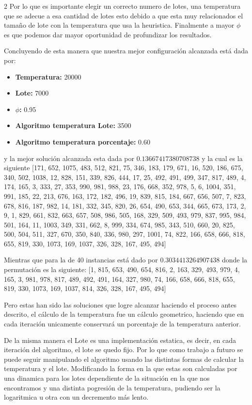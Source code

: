 \begin{multicols}{2}
Por lo que es importante elegir un correcto numero de lotes, una temperatura que se adecue a esa cantidad de lotes esto debido a que esta muy relacionados el tamaño de lote con la temperatura que usa la heuristica. Finalmente a mayor $\phi$ es que podemos dar mayor oportunidad de profundizar los resultados.

Concluyendo de esta manera que nuestra mejor configuración alcanzada está dada por:

\begin{itemize}
\item \textbf{Temperatura:} 20000
\item \textbf{Lote: } 7000
\item \textbf{$\phi$: } 0.95
\item \textbf{Algoritmo temperatura Lote: } 3500
\item \textbf{Algoritmo temperatura porcentaje: } 0.60
\end{itemize}

y la mejor solución alcanzada esta dada por $0.13667417380708738$ y la cual es la siguiente [171, 652, 1075, 483, 512, 821, 75, 346, 183, 179, 671, 16, 520, 186, 675, 340, 502, 1038, 12, 828, 151, 339, 826, 444, 17, 25, 492, 491, 499, 347, 817, 489, 4, 174, 165, 3, 333, 27, 353, 990, 981, 988, 23, 176, 668, 352, 978, 5, 6, 1004, 351, 991, 185, 22, 213, 676, 163, 172, 182, 496, 19, 839, 815, 184, 667, 656, 507, 7, 823, 678, 816, 187, 982, 14, 181, 332, 345, 820, 26, 654, 490, 653, 344, 665, 673, 173, 2, 9, 1, 829, 661, 832, 663, 657, 508, 986, 505, 168, 329, 509, 493, 979, 837, 995, 984, 501, 164, 11, 1003, 349, 331, 662, 8, 999, 334, 674, 985, 343, 510, 660, 20, 825, 500, 504, 511, 327, 670, 350, 840, 336, 980, 297, 1001, 74, 822, 166, 658, 666, 818, 655, 819, 330, 1073, 169, 1037, 326, 328, 167, 495, 494]

Mientras que para la de 40 instancias está dado por $0.3034413264907438$ donde la permutación es la siguiente: [1, 815, 653, 490, 654, 816, 2, 163, 329, 493, 979, 4, 165, 3, 981, 978, 817, 489, 492, 491, 164, 327, 980, 74, 166, 658, 666, 818, 655, 819, 330, 1073, 169, 1037, 814, 326, 328, 167, 495, 494] 

Pero estas han sido las soluciones que logre alcanzar haciendo el proceso antes descrito, el cálculo de la temperatura fue un cálculo geometrico, haciendo que en cada iteración unicamente conservará un porcentaje de la temperatura anterior.

De la misma manera el Lote es una implementación estatica, es decir, en cada iteración del algoritmo, el lote se quedo fijo. Por lo que como trabajo a futuro se puede seguir manipulando el algoritmo usando las distintas formas de calcular la temperatura y el lote. Modificando la forma en la que estas son calculadas por una dinamica para los lotes dependiente de la situación en la que nos encontramos y una distinta pogresión de la temperatura, pudiendo ser la logaritmica u otra con un decremento más lento.


\end{multicols}
